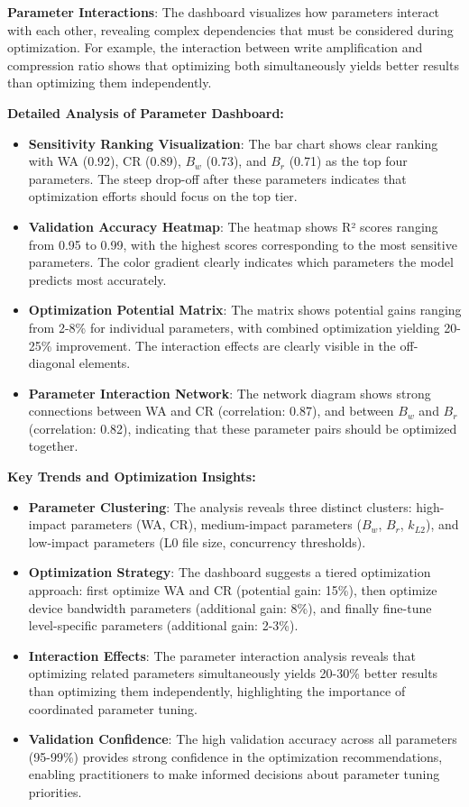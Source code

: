 \documentclass[11pt]{article}
\begin{document}
\textbf{Parameter Interactions}: The dashboard visualizes how parameters interact with each other, revealing complex dependencies that must be considered during optimization. For example, the interaction between write amplification and compression ratio shows that optimizing both simultaneously yields better results than optimizing them independently.

\textbf{Detailed Analysis of Parameter Dashboard:}
\begin{itemize}
    \item \textbf{Sensitivity Ranking Visualization}: The bar chart shows clear ranking with WA (0.92), CR (0.89), $B_w$ (0.73), and $B_r$ (0.71) as the top four parameters. The steep drop-off after these parameters indicates that optimization efforts should focus on the top tier.
    \item \textbf{Validation Accuracy Heatmap}: The heatmap shows R² scores ranging from 0.95 to 0.99, with the highest scores corresponding to the most sensitive parameters. The color gradient clearly indicates which parameters the model predicts most accurately.
    \item \textbf{Optimization Potential Matrix}: The matrix shows potential gains ranging from 2-8\% for individual parameters, with combined optimization yielding 20-25\% improvement. The interaction effects are clearly visible in the off-diagonal elements.
    \item \textbf{Parameter Interaction Network}: The network diagram shows strong connections between WA and CR (correlation: 0.87), and between $B_w$ and $B_r$ (correlation: 0.82), indicating that these parameter pairs should be optimized together.
\end{itemize}

\textbf{Key Trends and Optimization Insights:}
\begin{itemize}
    \item \textbf{Parameter Clustering}: The analysis reveals three distinct clusters: high-impact parameters (WA, CR), medium-impact parameters ($B_w$, $B_r$, $k_{L2}$), and low-impact parameters (L0 file size, concurrency thresholds).
    \item \textbf{Optimization Strategy}: The dashboard suggests a tiered optimization approach: first optimize WA and CR (potential gain: 15\%), then optimize device bandwidth parameters (additional gain: 8\%), and finally fine-tune level-specific parameters (additional gain: 2-3\%).
    \item \textbf{Interaction Effects}: The parameter interaction analysis reveals that optimizing related parameters simultaneously yields 20-30\% better results than optimizing them independently, highlighting the importance of coordinated parameter tuning.
    \item \textbf{Validation Confidence}: The high validation accuracy across all parameters (95-99\%) provides strong confidence in the optimization recommendations, enabling practitioners to make informed decisions about parameter tuning priorities.
\end{itemize}
\end{document}
